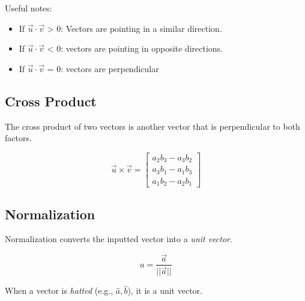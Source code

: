 \documentclass[12pt]{report}
\begin{document}
            Useful notes:

            \begin{itemize}
                \item If $\vec{u} \cdot \vec{v}$ 
                    > 0: Vectors are pointing in a similar direction.
                \item If $\vec{u} \cdot \vec{v}$ 
                    < 0: vectors are pointing in opposite directions.
                \item If $\vec{u} \cdot \vec{v}$ 
                    = 0: vectors are perpendicular
            \end{itemize}

        \subsection{Cross Product}
            The cross product of two vectors is another vector that is perpendicular to both factors.

            \begin{equation}
                \vec{u} \times \vec{v} = \begin{bmatrix} a_2b_3 - a_3b_2 \\ a_3b_1 - a_1b_3 \\ a_1b_2 - a_2b_1 \end{bmatrix}
            \end{equation}

        \subsection{Normalization}
            Normalization converts the inputted vector into a \emph{unit vector}.

            \begin{equation}
                \hat{a} = \frac{\vec{a}}{||\vec{a}||}
            \end{equation}

            When a vector is \emph{hatted} (e.g., $\hat{a}, \hat{b}$), it is a unit vector.
\end{document}

